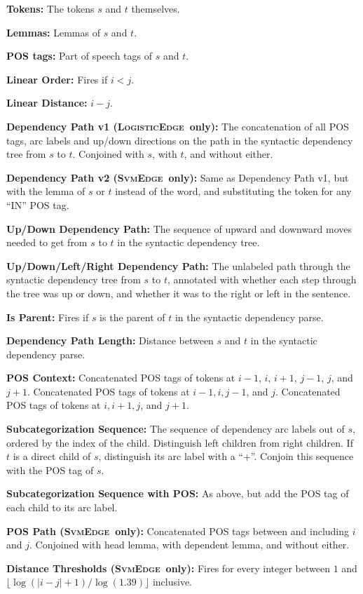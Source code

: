 \documentclass[11pt]{article}
\renewcommand\floatpagefraction{.9}
\newcommand{\logitedge}{\textsc{LogisticEdge}}
\newcommand{\svmedge}{\textsc{SvmEdge}}
\begin{document}
\renewcommand{\floatpagefraction}{0.8}
\begin{table}
\begin{framed}
\begin{small}

\textbf{Tokens:} The tokens $s$ and $t$ themselves.

\textbf{Lemmas:} Lemmas of $s$ and $t$.

\textbf{POS tags:} Part of speech tags of $s$ and $t$.

\textbf{Linear Order:} Fires if $i < j$.

\textbf{Linear Distance:} $i - j$.

\textbf{Dependency Path v1 (\logitedge~only):} The concatenation of all POS
tags, arc labels and up/down directions on the path in the syntactic dependency
tree from $s$ to $t$.  Conjoined with $s$, with $t$, and without either.

\textbf{Dependency Path v2 (\svmedge~only):}
Same as Dependency Path v1, but with the lemma of $s$ or $t$ instead of the
word, and substituting the token for any ``IN'' POS tag.

\textbf{Up/Down Dependency Path:} The sequence of upward and
	downward moves needed to get from $s$ to $t$ in the syntactic dependency
	tree.

\textbf{Up/Down/Left/Right Dependency Path:} The unlabeled path through
	the syntactic dependency tree from $s$ to $t$, annotated with whether each
	step through the tree was up or down, and whether it was to the right or left
	in the sentence.

\textbf{Is Parent:} Fires if  $s$ is the parent of $t$ in the syntactic
	dependency parse.

\textbf{Dependency Path Length:} Distance between $s$ and $t$ in the
	syntactic dependency parse.

\textbf{POS Context:} Concatenated POS tags of tokens at $i-1$, $i$,
	$i+1$, $j-1$, $j$, and $j+1$. Concatenated POS tags of tokens at $i-1, i, j-1$,
	and $j$. Concatenated POS tags of tokens at $i, i+1, j$, and $j+1$.

\textbf{Subcategorization Sequence:} 
	The sequence of dependency arc labels out of $s$, ordered by the index of the
	child.
	Distinguish left children from right children.
	If $t$ is a direct child of $s$, distinguish its arc label with a ``+''.
	Conjoin this sequence with the POS tag of $s$.

\textbf{Subcategorization Sequence with POS:} As above, but add the
	POS tag of each child to its arc label.

\textbf{POS Path (\svmedge~only):}
Concatenated POS tags between and including $i$ and $j$.
Conjoined with head lemma, with dependent lemma, and without either.


\textbf{Distance Thresholds (\svmedge~only):}
Fires for every integer between $1$ and $\lfloor \log(|i-j|+1)/\log(1.39)
\rfloor$ inclusive.

\end{small}
\end{framed}
\caption{Features used in edge prediction}
\label{table:edgefeatures}
\end{table}
\end{document}
